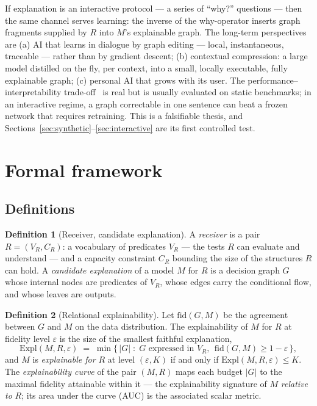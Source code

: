 \documentclass[10pt]{article}
\theoremstyle{definition}
\newtheorem{definition}{Definition}
\theoremstyle{plain}
\begin{document}
If explanation is an interactive protocol --- a series of ``why?'' questions --- then the same channel serves learning: the inverse of the why-operator inserts graph fragments supplied by $R$ into $M$'s explainable graph. The long-term perspectives are (a) AI that learns in dialogue by graph editing --- local, instantaneous, traceable --- rather than by gradient descent; (b) contextual compression: a large model distilled on the fly, per context, into a small, locally executable, fully explainable graph; (c) personal AI that grows with its user. The performance--interpretability trade-off~\citep{rudin2019stop} is real but is usually evaluated on static benchmarks; in an interactive regime, a graph correctable in one sentence can beat a frozen network that requires retraining. This is a falsifiable thesis, and Sections~\ref{sec:synthetic}--\ref{sec:interactive} are its first controlled test.

\section{Formal framework}
\label{sec:framework}

\subsection{Definitions}
\label{sec:defs}

\begin{definition}[Receiver, candidate explanation]
\label{def:receiver}
A \emph{receiver} is a pair $R = (V_R, C_R)$: a vocabulary of predicates $V_R$ --- the tests $R$ can evaluate and understand --- and a capacity constraint $C_R$ bounding the size of the structures $R$ can hold. A \emph{candidate explanation} of a model $M$ for $R$ is a decision graph $G$ whose internal nodes are predicates of $V_R$, whose edges carry the conditional flow, and whose leaves are outputs.
\end{definition}

\begin{definition}[Relational explainability]
\label{def:expl}
Let $\mathrm{fid}(G, M)$ be the agreement between $G$ and $M$ on the data distribution. The explainability of $M$ for $R$ at fidelity level $\varepsilon$ is the size of the smallest faithful explanation,
\begin{equation}
\label{eq:expl}
\mathrm{Expl}(M, R, \varepsilon) \;=\; \min \bigl\{\, |G| \;:\; G \text{ expressed in } V_R,\ \ \mathrm{fid}(G, M) \ge 1 - \varepsilon \,\bigr\},
\end{equation}
and $M$ is \emph{explainable for $R$} at level $(\varepsilon, K)$ if and only if $\mathrm{Expl}(M, R, \varepsilon) \le K$. The \emph{explainability curve} of the pair $(M, R)$ maps each budget $|G|$ to the maximal fidelity attainable within it --- the explainability signature of $M$ \emph{relative to} $R$; its area under the curve (AUC) is the associated scalar metric.
\end{definition}
\end{document}
